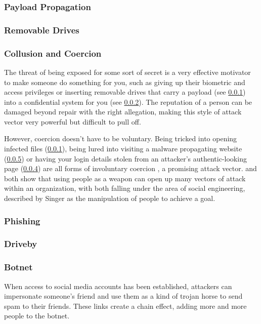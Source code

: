 \documentclass[a4paper, 11pt]{article}
\begin{document}
\subsubsection{Payload Propagation}
\label{sec:payloads}

\subsubsection{Removable Drives}
\label{sec:removabledrives}

\subsubsection{Collusion and Coercion}
\label{sec:coercion}
The threat of being exposed for some sort of secret is a very effective motivator to make someone do something for you, such as giving up their biometric and access privileges \cite{ref:biometricattackvectors} or inserting removable drives that carry a payload (see \ref{sec:payloads}) into a confidential system for you (see \ref{sec:removabledrives}). The reputation of a person can be damaged beyond repair with the right allegation, making this style of attack vector very powerful but difficult to pull off.

However, coercion doesn't have to be voluntary. Being tricked into opening infected files (\ref{sec:payloads}), being lured into visiting a malware propagating website (\ref{sec:driveby}) or having your login details stolen from an attacker's authentic-looking page (\ref{sec:phishing}) are all forms of involuntary coercion \cite{ref:jang2014survey,ref:singer2014cybersecurity}, a promising attack vector. \cite{ref:biometricattackvectors} and \cite{ref:jang2014survey} both show that using people as a weapon can open up many vectors of attack within an organization, with both falling under the area of social engineering, described by Singer \cite{ref:singer2014cybersecurity} as the manipulation of people to achieve a goal.

\subsubsection{Phishing}
\label{sec:phishing}


\subsubsection{Driveby}
\label{sec:driveby}

\subsubsection{Botnet}
\label{sec:botnet}
When access to social media accounts has been established, attackers can impersonate someone's friend and use them as a kind of trojan horse to send spam to their friends. These links create a chain effect, adding more and more people to the botnet. \cite{ref:jang2014survey}
\end{document}
